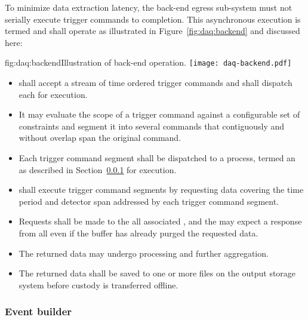 To minimize data extraction latency, the back-end egress sub-system must not serially execute trigger commands to completion. 
This asynchronous execution is termed  and shall operate as illustrated in Figure~\ref{fig:daq:backend} and discussed here:

\begin{dunefigure}{fig:daq:backend}{Illustration of   back-end operation.}
  \texttt{[image: daq-backend.pdf]}
\end{dunefigure}

\begin{itemize}
\item {} shall accept a stream of time ordered trigger commands and shall dispatch each for execution.
\item It may evaluate the scope of a trigger command against a configurable set of constraints and segment it into several commands that contiguously and without overlap span the original command.
\item Each trigger command segment shall be dispatched to a process, termed an  as described in Section~\ref{sec:fd-daq:design-event-builder} for execution.
\item {} shall execute trigger command segments by requesting data covering the time period and detector span addressed by each trigger command segment.
\item Requests shall be made to the all associated ,  and the  may expect a response from all even if the buffer has already purged the requested data.
\item The returned data may undergo processing and further aggregation.
\item The returned data shall be saved to one or more files on the output storage system before custody is transferred offline.
\end{itemize}



\subsubsection{Event builder}
\label{sec:fd-daq:design-event-builder}


